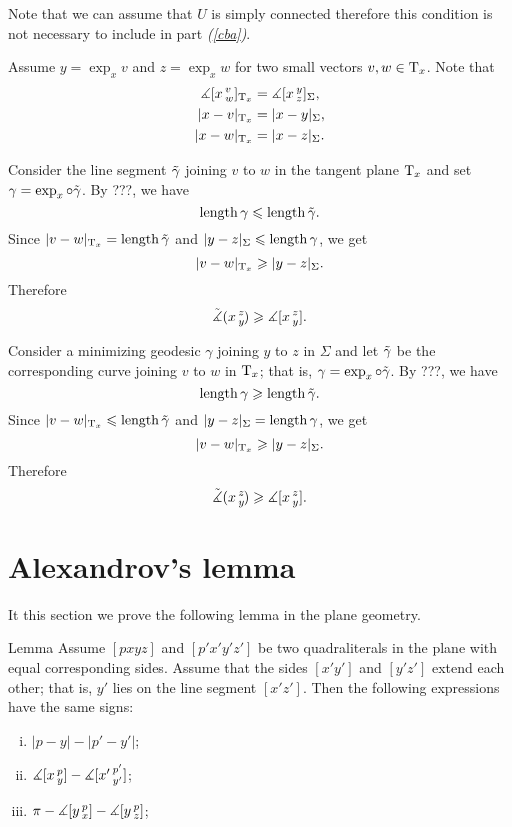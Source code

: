 Note that we can assume that $U$ is simply connected therefore this condition is not necessary to include in part \textit{(\ref{cba})}.

Assume $y=\exp_xv$ and $z=\exp_xw$ for two small vectors $v,w\in\T_x$.
Note that 
\begin{align*}
\measuredangle \hinge xvw_{\T_x}&=\measuredangle \hinge xyz_\Sigma,
\\
|x-v|_{\T_x}&=|x-y|_\Sigma, 
\\
|x-w|_{\T_x}&=|x-z|_\Sigma.
\end{align*}

Consider the line segment $\~\gamma$ joining $v$ to $w$ in the tangent plane $\T_x$ and set $\gamma=\exp_x\circ\~\gamma$.
By ???, we have
\[\length\gamma\le \length \~\gamma.\]
Since $|v-w|_{\T_x}=\length\~\gamma$ and $|y-z|_{\Sigma}\le \length\gamma$, we get 
\[|v-w|_{\T_x}\ge |y-z|_\Sigma.\]
Therefore
\[\angk xzy\ge \measuredangle\hinge xzy.\]

Consider a minimizing geodesic $\gamma$ joining $y$ to $z$ in $\Sigma$ and let $\~\gamma$ be the corresponding curve joining $v$ to $w$ in $\T_x$; that is,  $\gamma=\exp_x\circ\~\gamma$.
By ???, we have
\[\length\gamma\ge \length \~\gamma.\]
Since $|v-w|_{\T_x}\le\length\~\gamma$ and $|y-z|_{\Sigma}= \length\gamma$, we get 
\[|v-w|_{\T_x}\ge |y-z|_\Sigma.\]
Therefore
\[\angk xzy\ge \measuredangle\hinge xzy.\]
\qedsf

\section*{Alexandrov's lemma}

It this section we prove the following lemma in the plane geometry.

\begin{thm}{Lemma}
\label{lem:alex}
Assume $[pxyz]$ and $[p'x'y'z']$ be two quadraliterals in the plane with equal corresponding sides.
Assume that the sides $[x'y']$ and $[y'z']$ extend each other; that is, $y'$ lies on the line segment $[x'z']$.
Then the following expressions have the same signs:
\begin{enumerate}[(i)]
 \item $|p-y|-|p'-y'|$;
 \item $\measuredangle\hinge xpy-\measuredangle\hinge {x'}{p'}{y'}$;
 \item $\pi-\measuredangle\hinge ypx-\measuredangle\hinge ypz$;
\end{enumerate}
\end{thm}

